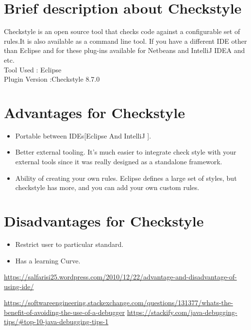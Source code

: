 \documentclass{article}
\begin{document}
\section{Brief description about Checkstyle}
Checkstyle is an open source tool that checks code against a configurable set of rules.It is also available as a command line tool. If you have a different IDE other than Eclipse and for these plug-ins available for Netbeans and IntelliJ IDEA and etc.\\
Tool Used : Eclipse \\
Plugin Version :Checkstyle 8.7.0

\section{Advantages for Checkstyle}
\begin{itemize}
  \item Portable between IDEs[Eclipse And IntelliJ ].
  \item Better external tooling. It's much easier to integrate check style with your external tools since it was really designed as a standalone framework.
  \item Ability of creating your own rules. Eclipse defines a large set of styles, but checkstyle has more, and you can add your own custom rules.
\end{itemize}

\section{Disadvantages for Checkstyle}

\begin{itemize}
  \item Restrict user to particular standard.
  \item Has a learning Curve.
\end{itemize}




  
\begin{thebibliography}{1}

\url{https://salfarisi25.wordpress.com/2010/12/22/advantage-and-disadvantage-of-using-ide/}

\url{https://softwareengineering.stackexchange.com/questions/131377/whats-the-benefit-of-avoiding-the-use-of-a-debugger}
\url{https://stackify.com/java-debugging-tips/#top-10-java-debugging-tips-1}

\end{thebibliography}
\end{document}
